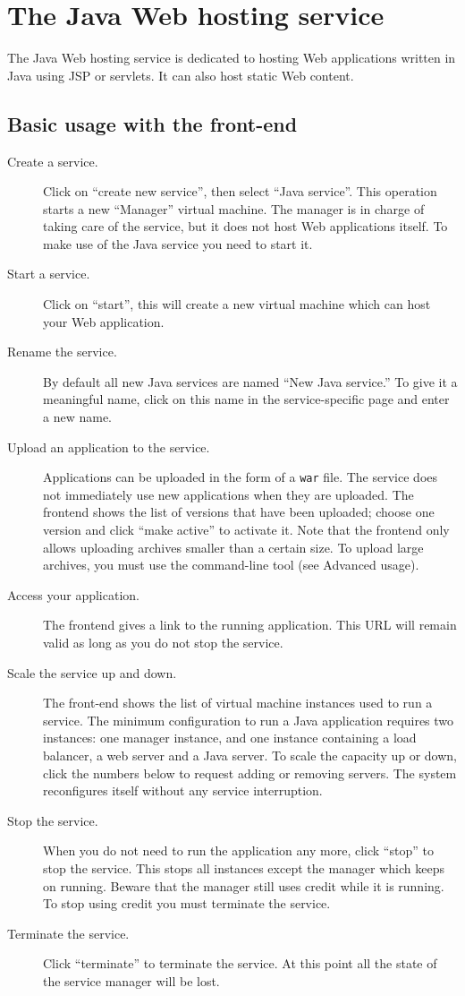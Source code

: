 \documentclass[10pt]{article}
\begin{document}
\section{The Java Web hosting service}

The Java Web hosting service is dedicated to hosting Web applications
written in Java using JSP or servlets. It can also host static Web
content.

\subsection{Basic usage with the front-end}

\begin{description}
\item[Create a service.] Click on ``create new service'', then select
  ``Java service''. This operation starts a new ``Manager'' virtual
  machine. The manager is in charge of taking care of the service, but
  it does not host Web applications itself. To make use of the Java
  service you need to start it.
\item[Start a service.] Click on ``start'', this will create a new
  virtual machine which can host your Web application.
\item[Rename the service.] By default all new Java services are named
  ``New Java service.'' To give it a meaningful name, click on this
  name in the service-specific page and enter a new name.
\item[Upload an application to the service.] Applications can be
  uploaded in the form of a \texttt{war} file. The service does not
  immediately use new applications when they are uploaded. The
  frontend shows the list of versions that have been uploaded; choose
  one version and click ``make active'' to activate it. Note that the
  frontend only allows uploading archives smaller than a certain size.
  To upload large archives, you must use the command-line tool (see
  Advanced usage).
\item[Access your application.] The frontend gives a link to the
  running application. This URL will remain valid as long as you do
  not stop the service.
\item[Scale the service up and down.] The front-end shows the list of
  virtual machine instances used to run a service. The minimum
  configuration to run a Java application requires two instances: one
  manager instance, and one instance containing a load balancer, a web
  server and a Java server. To scale the capacity up or down, click the
  numbers below to request adding or removing servers. The system
  reconfigures itself without any service interruption.
\item[Stop the service.] When you do not need to run the application
  any more, click ``stop'' to stop the service. This stops all
  instances except the manager which keeps on running. Beware that the
  manager still uses credit while it is running. To stop using credit
  you must terminate the service.
\item[Terminate the service.] Click ``terminate'' to terminate the
  service. At this point all the state of the service manager will be
  lost.
\end{description}
\end{document}
